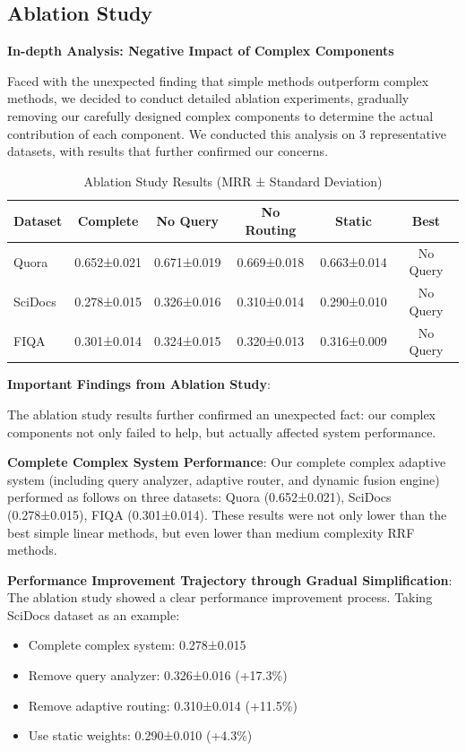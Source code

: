 \documentclass[letterpaper]{article} %
\begin{document}
\subsection{Ablation Study}

\textbf{In-depth Analysis: Negative Impact of Complex Components}

Faced with the unexpected finding that simple methods outperform complex methods, we decided to conduct detailed ablation experiments, gradually removing our carefully designed complex components to determine the actual contribution of each component. We conducted this analysis on 3 representative datasets, with results that further confirmed our concerns.

\begin{table}[t]
\centering
\caption{Ablation Study Results (MRR ± Standard Deviation)}
\label{tab:ablation}
\tiny
\begin{tabular}{lccccc}
\toprule
Dataset & Complete & No Query & No Routing & Static & Best \\
\midrule
Quora & 0.652±0.021 & 0.671±0.019 & 0.669±0.018 & 0.663±0.014 & No Query \\
SciDocs & 0.278±0.015 & 0.326±0.016 & 0.310±0.014 & 0.290±0.010 & No Query \\
FIQA & 0.301±0.014 & 0.324±0.015 & 0.320±0.013 & 0.316±0.009 & No Query \\
\bottomrule
\end{tabular}
\end{table}

\textbf{Important Findings from Ablation Study}:

The ablation study results further confirmed an unexpected fact: our complex components not only failed to help, but actually affected system performance.

\textbf{Complete Complex System Performance}: Our complete complex adaptive system (including query analyzer, adaptive router, and dynamic fusion engine) performed as follows on three datasets: Quora (0.652±0.021), SciDocs (0.278±0.015), FIQA (0.301±0.014). These results were not only lower than the best simple linear methods, but even lower than medium complexity RRF methods.

\textbf{Performance Improvement Trajectory through Gradual Simplification}: The ablation study showed a clear performance improvement process. Taking SciDocs dataset as an example:
\begin{itemize}
\item Complete complex system: 0.278±0.015
\item Remove query analyzer: 0.326±0.016 (+17.3\%)
\item Remove adaptive routing: 0.310±0.014 (+11.5\%)
\item Use static weights: 0.290±0.010 (+4.3\%)
\end{itemize}
\end{document}
